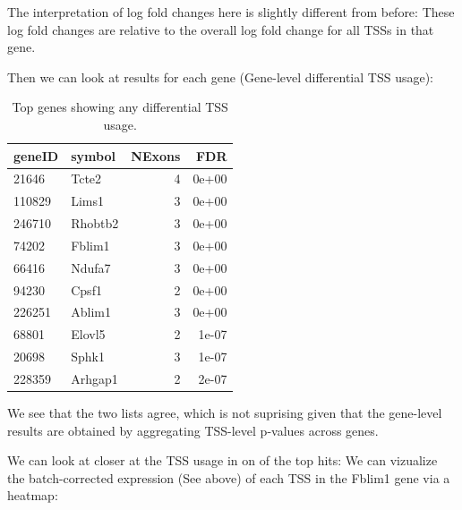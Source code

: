 \documentclass[9pt,a4paper,]{extarticle}
\newenvironment{Shaded}{\begin{snugshade}}{\end{snugshade}}
\newcommand{\KeywordTok}[1]{\textcolor[rgb]{0.13,0.29,0.53}{\textbf{{#1}}}}
\newcommand{\DataTypeTok}[1]{\textcolor[rgb]{0.13,0.29,0.53}{{#1}}}
\newcommand{\StringTok}[1]{\textcolor[rgb]{0.31,0.60,0.02}{{#1}}}
\newcommand{\OtherTok}[1]{\textcolor[rgb]{0.56,0.35,0.01}{{#1}}}
\newcommand{\NormalTok}[1]{{#1}}
\begin{document}
The interpretation of log fold changes here is slightly different from before: These log fold changes are relative to the overall log fold change for all TSSs in that gene.

Then we can look at results for each gene (Gene-level differential TSS usage):

\begin{Shaded}
\end{Shaded}

\begin{table}[t]

\caption{\label{tab:dtuGene}Top genes showing any differential TSS usage.}
\centering
\begin{tabular}{l|l|r|r}
\hline
geneID & symbol & NExons & FDR\\
\hline
21646 & Tcte2 & 4 & 0e+00\\
\hline
110829 & Lims1 & 3 & 0e+00\\
\hline
246710 & Rhobtb2 & 3 & 0e+00\\
\hline
74202 & Fblim1 & 3 & 0e+00\\
\hline
66416 & Ndufa7 & 3 & 0e+00\\
\hline
94230 & Cpsf1 & 2 & 0e+00\\
\hline
226251 & Ablim1 & 3 & 0e+00\\
\hline
68801 & Elovl5 & 2 & 1e-07\\
\hline
20698 & Sphk1 & 3 & 1e-07\\
\hline
228359 & Arhgap1 & 2 & 2e-07\\
\hline
\end{tabular}
\end{table}

We see that the two lists agree, which is not suprising given that the gene-level results are obtained by aggregating TSS-level p-values across genes.

We can look at closer at the TSS usage in on of the top hits: We can vizualize the batch-corrected expression (See above) of each TSS in the Fblim1 gene via a heatmap:
\end{document}
